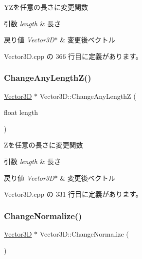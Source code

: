 Y\+Zを任意の長さに変更関数 


\begin{DoxyParams}{引数}
{\em length} & 長さ \\
\hline
\end{DoxyParams}

\begin{DoxyRetVals}{戻り値}
{\em Vector3\+D$\ast$} & 変更後ベクトル \\
\hline
\end{DoxyRetVals}


 Vector3\+D.\+cpp の 366 行目に定義があります。

\mbox{\label{class_vector3_d_aeb984fa3378a2f19e98e24e042d9533c}} 
\subsubsection{\texorpdfstring{Change\+Any\+Length\+Z()}{ChangeAnyLengthZ()}}
{\footnotesize\ttfamily \mbox{\hyperlink{class_vector3_d}{Vector3D}} $\ast$ Vector3\+D\+::\+Change\+Any\+LengthZ (\begin{DoxyParamCaption}\item[{float}]{length }\end{DoxyParamCaption})}



Zを任意の長さに変更関数 


\begin{DoxyParams}{引数}
{\em length} & 長さ \\
\hline
\end{DoxyParams}

\begin{DoxyRetVals}{戻り値}
{\em Vector3\+D$\ast$} & 変更後ベクトル \\
\hline
\end{DoxyRetVals}


 Vector3\+D.\+cpp の 331 行目に定義があります。

\mbox{\label{class_vector3_d_a43de085342dac1c57c5f66f0d6e6ef66}} 
\subsubsection{\texorpdfstring{Change\+Normalize()}{ChangeNormalize()}}
{\footnotesize\ttfamily \mbox{\hyperlink{class_vector3_d}{Vector3D}} $\ast$ Vector3\+D\+::\+Change\+Normalize (\begin{DoxyParamCaption}{ }\end{DoxyParamCaption})}



